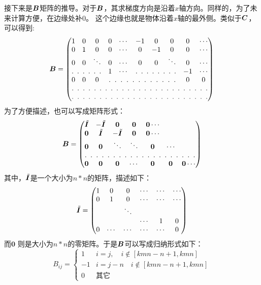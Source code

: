 接下来是$\bm{ B}$矩阵的推导。对于$\bm{ B}$，其求梯度方向是沿着$x$轴方向。同样的，为了未来计算方便，在边缘处补$0$。
这个边缘也就是物体沿着$x$轴的最外侧。类似于$\bm{C}$，可以得到:
\begin{equation*}
\B = \begin{pmatrix}
1 & 0 & 0 & 0 & \cdots &-1 & 0 &0 &0 &\cdots \\
0 & 1 & 0 & 0 &\cdots &0 & -1 &0 &0 &\cdots \\
0 & 0 & \ddots & 0 & \cdots & 0 & 0 & \ddots & 0& \cdots \\
\hdotsfor[3]{3}& 1& \cdots &\hdotsfor[3]{3}&-1&\cdots \\
0 & 0 & 0 & \hdotsfor[3]{5}&0&0 \\
\hdotsfor[3]{10}\\
\hdotsfor[3]{10}
\end{pmatrix}
\end{equation*}
为了方便描述，也可以写成矩阵形式：
\begin{equation*}
\B = \begin{pmatrix}
\tilde{\bI} &  -\tilde{\bI} & \0 & \0 & \0 \cdots \\
\0 & \tilde{\bI} &  -\tilde{\bI} & \0 & \0 \cdots \\
\0 & \0  & \ddots & \ddots & \0 & \cdots \\
\hdotsfor[3]{7} \\
\0 & \0 & \0 &\cdots & \0 & \0 &\0 \cdots
\end{pmatrix}
\end{equation*}
其中，$\tilde{\bm{I}}$是一个大小为$n * n$的矩阵，描述如下：
\begin{equation*}
\tilde{\bm{I}} = \begin{pmatrix}
1 & 0 & 0 & \cdots &\cdots & \cdots\\
0 & 1 & 0 & \cdots &\cdots & \cdots\\
 & &\ddots & \\
& & & \cdots& 1 & 0 \\
0 & \cdots & \cdots & \cdots & \cdots & 0 
\end{pmatrix}
\end{equation*}
而$\bm 0$ 则是大小为$n * n$的零矩阵。于是$\bm{ B}$可以写成归纳形式如下：
\begin{equation}\label{eq:B}
B_{ij} = \begin{cases}
1 & i=j, \quad i \notin [kmn-n+1,kmn] \\
-1 & i = j-n \quad i \notin [kmn-n+1,kmn] \\
0 & \text{其它}
\end{cases}
\end{equation}

